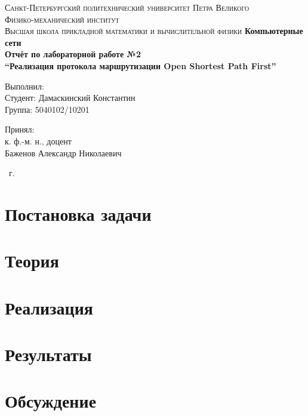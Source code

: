 \documentclass[14pt,a4paper,article]{ncc}
\begin{document}
\begin{titlepage}
    \begin{center}
        \textsc{
            Санкт-Петербургский политехнический университет Петра Великого \\[5mm]
            Физико-механический институт\\[2mm]
            Высшая школа прикладной математики и вычислительной физики
        }   
        \vfill
        \textbf{\large
            Компьютерные сети\\
            Отчёт по лабораторной работе №2 \\
            ``Реализация протокола маршрутизации Open Shortest Path First'' \\[3mm]
        }                
    \end{center}

    \vfill
    \hfill
    \begin{minipage}{0.5\textwidth}
        Выполнил: \\[2mm]   
		Студент: Дамаскинский Константин \\
		Группа: 5040102/10201\\
    \end{minipage}

	\hfill
	\begin{minipage}{0.5\textwidth}
		Принял: \\[2mm]
		к. ф.-м. н., доцент \\   
		Баженов Александр Николаевич
	\end{minipage}

    \vfill
    \begin{center}
        \theyear\ г.
    \end{center}
\end{titlepage}

\tableofcontents
\newpage

\section{Постановка задачи}


\section{Теория}


\section{Реализация}


\section{Результаты}


\section{Обсуждение}


\printbibliography


\end{document}
